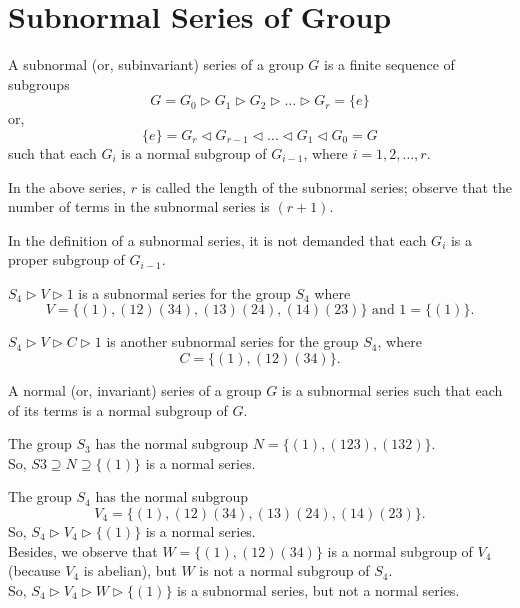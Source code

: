 \documentclass[../main-sheet.tex]{subfiles}
\begin{document}
\chapter{Subnormal Series of Group}
\begin{defn}
    A subnormal (or, subinvariant) series of a group \(G\) is a finite sequence of subgroups
    \begin{equation}
        G = G_0 \vartriangleright  G_1 \vartriangleright  G_2 \vartriangleright  \dots \vartriangleright  G_r=\{e\} \label{eq:subnormal1}
    \end{equation}
    or,
    \[
        \{e\}=G_r\vartriangleleft G_{r-1} \vartriangleleft \dots \vartriangleleft G_1 \vartriangleleft G_0=G
    \]
    such that each \(G_i \) is a normal subgroup of \(G_{i-1}\), where \(i = 1, 2,\dots, r\).
\end{defn}
\begin{note}
In the above series, \(r\) is called the length of the subnormal series; observe
that the number of terms in the subnormal series is \((r + 1)\).
\end{note}
\begin{rem}
In the definition of a subnormal series, it is not demanded that each \(G_i\) is
a proper subgroup of \(G_{i-1}\).
\end{rem}
\begin{ex}
\(S_4 \vartriangleright  V \vartriangleright  1\) is a subnormal series for the group \(S_4\)
where
\[ V = \{(1), (1 2)(3 4), (13)(2 4), (1 4)(2 3)\} \text{ and } 1 = \{(1)\}.\]
\end{ex}
\begin{ex}
\(S_4 \vartriangleright  V \vartriangleright  C \vartriangleright  1\) is another subnormal series for the group \(S_4\), where 
\[C = \{(1), (1 2 )(3 4)\}.\]
\end{ex}
\begin{defn}
    A normal (or, invariant) series of a group \(G\) is a subnormal series such
    that each of its terms is a normal subgroup of \(G\).
\end{defn}
\begin{ex}
    The group \(S_3\) has the normal subgroup \(N = \{(1), (1 2 3), (1 3 2)\}\).\\
    So, \(S3 \supseteq N \supseteq \{(1)\}\) is a normal series.
\end{ex}
\begin{ex}
    The group \(S_4\) has the normal subgroup
    \[V_4 = \{(1), (1 2) (3 4), (1 3) (2 4), (1 4)(2 3)\}.\]
    So, \(S_4 \vartriangleright   V_4 \vartriangleright   \{(1)\}\) is a normal series.\\
    Besides, we observe that \(W = \{(1), (1 2) (3 4)\}\) is a normal subgroup of \(V_4\) (because \(V_4\)
    is abelian), but \(W\) is not a normal subgroup of \(S_4\).\\
    So, \(S_4 \vartriangleright   V_4\vartriangleright  W \vartriangleright   \{(1)\}\) is a subnormal series, but not a normal series.
\end{ex}
\end{document}
